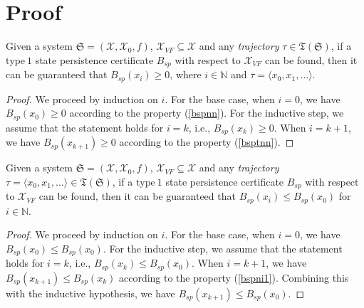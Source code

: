 \documentclass[acmlarge]{acmart}
\begin{document}



\appendix
\section{Proof}
\begin{lemma}
  \label{bspnnlemma0}
  Given a system $\mathfrak{S}=(\mathcal{X}, \mathcal{X}_0, f)$, $\mathcal{X}_{VF} \subseteq \mathcal{X}$ and any \emph{trajectory} $\tau \in \mathfrak{T}(\mathfrak{S})$, 
  if a $\mathrm{type~1}$ state persistence certificate $B_{sp}$ with respect to $\mathcal{X}_{VF}$ can be found, 
  then it can be guaranteed that $B_{sp}(x_i) \geq 0$, where $i \in \mathbb{N}$ and $\tau = \langle x_0, x_1, \dots \rangle$.
\end{lemma}
\begin{proof}
  We proceed by induction on $i$. 
  For the base case, when $i = 0$, we have $B_{sp}(x_0) \geq 0$ according to the property (\ref{bspnn}).
  For the inductive step, we assume that the statement holds for $i = k$, i.e., $B_{sp}(x_k) \geq 0$. 
  When $i = k + 1$, we have $B_{sp}(x_{k+1}) \geq 0$ according to the property (\ref{bsptnn}).
\end{proof}
\begin{lemma}
  \label{state-persistence-lemma-b0-top}
  Given a system $\mathfrak{S}=(\mathcal{X}, \mathcal{X}_0, f)$, $\mathcal{X}_{VF} \subseteq \mathcal{X}$ and any \emph{trajectory} $\tau = \langle x_0, x_1, \dots \rangle \in \mathfrak{T}(\mathfrak{S})$, 
  if a $\mathrm{type~1}$ state persistence certificate $B_{sp}$ with respect to $\mathcal{X}_{VF}$ can be found, 
  then it can be guaranteed that $B_{sp}(x_i) \leq B_{sp}(x_0)$ for $i \in \mathbb{N}$.
\end{lemma}
\begin{proof}
  We proceed by induction on $i$.
  For the base case, when $i = 0$, we have $B_{sp}(x_0) \leq B_{sp}(x_0)$.
  For the inductive step, we assume that the statement holds for $i = k$, i.e., $B_{sp}(x_k) \leq B_{sp}(x_0)$.
  When $i = k+1$, we have $B_{sp}(x_{k+1}) \leq B_{sp}(x_k)$ according to the property (\ref{bspni1}). Combining this with the inductive hypothesis, we have $B_{sp}(x_{k+1}) \leq B_{sp}(x_0)$.
\end{proof}
\end{document}
